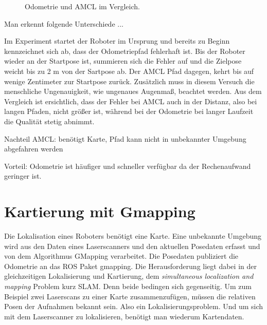 \documentclass[11pt,a4paper]{article}
\begin{document}
{\begin{figure}[h]
	\centering
	\par\medskip
	\caption{ Odometrie und AMCL im Vergleich. }
\end{figure}




Man erkennt folgende Unterschiede ...

Im Experiment startet der Roboter im Ursprung und bereits zu Beginn kennzeichnet sich ab, dass der Odometriepfad fehlerhaft ist. Bis der Roboter wieder an der Startpose ist, summieren sich die Fehler auf und die Zielpose weicht bis zu 2 m von der Sartpose ab. Der AMCL Pfad dagegen, kehrt bis auf wenige Zentimeter zur Startpose zur\"uck. Zus\"atzlich muss in diesem Versuch die menschliche Ungenauigkeit, wie ungenaues Augenma{\ss}, beachtet werden. Aus dem Vergleich ist ersichtlich, dass der Fehler bei AMCL auch in der Distanz, also bei langen Pfaden, nicht gr\"o{\ss}er ist, w\"ahrend bei der Odometrie bei langer Laufzeit die Qualit\"at stetig abnimmt.


Nachteil AMCL: benötigt Karte, Pfad kann nicht in unbekannter Umgebung abgefahren werden

Vorteil: Odometrie ist h\"aufiger und schneller verf\"ugbar da der Rechenaufwand geringer ist. 


\section{Kartierung mit Gmapping} \cite{gmapping}
Die Lokalisation eines Roboters ben\"otigt eine Karte. Eine unbekannte Umgebung wird aus den Daten eines Laserscanners und den aktuellen Posedaten erfasst und von dem Algorithmus GMapping verarbeitet. Die Posedaten publiziert die Odometrie an das ROS Paket gmapping.
Die Herausforderung liegt dabei in der gleichzeitigen Lokalisierung und Kartierung, dem \textit{simultaneous localization and mapping} Problem kurz SLAM. Denn beide bedingen sich gegenseitig. Um zum Beispiel zwei Laserscans zu einer Karte zusammenzuf\"ugen, m\"ussen die relativen Posen der Aufnahmen bekannt sein. Also ein Lokalisierungsproblem. Und um sich mit dem Laserscanner zu lokalisieren, ben\"otigt man wiederum Kartendaten. 

}
\end{document}
